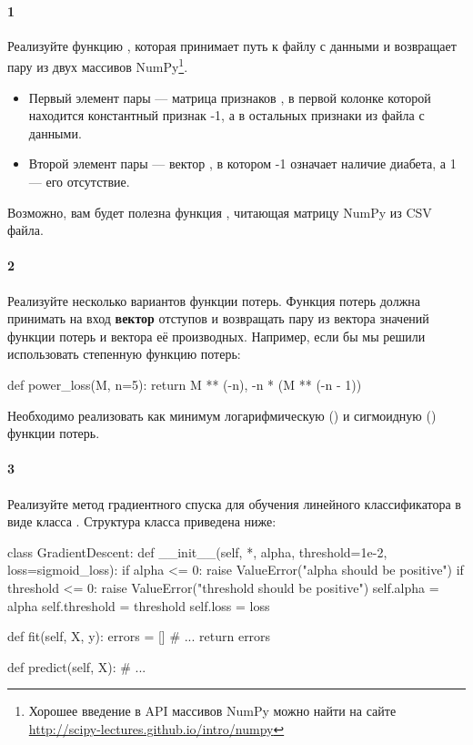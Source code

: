 \documentclass[a4paper,12pt]{article}
\begin{document}
\paragraph{1} Реализуйте функцию , которая принимает
путь к файлу с данными и возвращает пару из двух массивов NumPy\footnote{Хорошее
  введение в API массивов NumPy можно найти на сайте
  \url{http://scipy-lectures.github.io/intro/numpy}}.
\begin{itemize}
\item Первый элемент пары --- матрица признаков , в первой
  колонке которой находится константный признак -1, а в остальных признаки из
  файла с данными.
\item Второй элемент пары --- вектор , в котором -1 означает
  наличие диабета, а 1 --- его отсутствие.
\end{itemize}

Возможно, вам будет полезна функция , читающая матрицу
NumPy из CSV файла.

\paragraph{2} Реализуйте несколько вариантов функции потерь. Функция потерь
должна принимать на вход \textbf{вектор} отступов  и возвращать
пару из вектора значений функции потерь и вектора её производных. Например, если
бы мы решили использовать степенную функцию потерь:
\begin{python3}
def power_loss(M, n=5):
    return M ** (-n), -n * (M ** (-n - 1))
\end{python3}

Необходимо реализовать как минимум логарифмическую () и
сигмоидную () функции потерь.

\paragraph{3} Реализуйте метод градиентного спуска для обучения линейного
классификатора в виде класса . Структура класса
приведена ниже:
\begin{python3}
class GradientDescent:
    def __init__(self, *, alpha, threshold=1e-2, loss=sigmoid_loss):
        if alpha <= 0:
            raise ValueError("alpha should be positive")
        if threshold <= 0:
            raise ValueError("threshold should be positive")
        self.alpha = alpha
        self.threshold = threshold
        self.loss = loss

    def fit(self, X, y):
        errors = []
        # ...
        return errors

    def predict(self, X):
        # ...
\end{python3}
\end{document}
